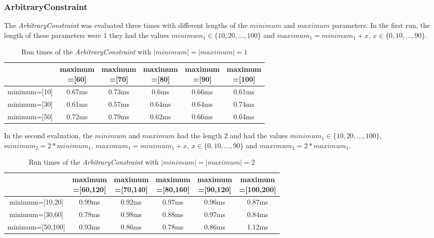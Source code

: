 \subsubsection{ArbitraryConstraint}
The \textit{ArbitraryConstraint} was evaluated three times with different lengths of the $minimum$ and $maximum$ parameters. In the first run, the length of these parameters were 1 they had the values $minimum_1\in\{10, 20, ..., 100\}$ and $maximum_1=minimum_1+x$, $x\in\{0, 10, ..., 90\}$.
\begin{table}
	\begin{tabular}{|c|c|c|c|c|c|}
		\hline
		&\makecell{maximum\\=[60]} & \makecell{maximum\\=[70]} &  \makecell{maximum\\=[80]} & \makecell{maximum\\=[90]} & \makecell{maximum\\=[100]}\\
		\hline
		minimum=[10] & 0.67ms & 0.73ms & 0.6ms & 0.66ms & 0.61ms\\
		\hline
		minimum=[30] & 0.61ms & 0.57ms & 0.64ms & 0.64ms & 0.74ms\\
		\hline
		minimum=[50] & 0.72ms & 0.79ms & 0.62ms & 0.66ms & 0.64ms\\
		\hline
	\end{tabular}
	\centering
	\caption{Run times of the \textit{ArbitraryConstraint} with $|minimum|=|maximum|=1$}
	\label{tab:runtimeArbitraryConstraint1}
\end{table}
In the second evaluation, the $minimum$ and $maximum$ had the length 2 and had the values $minimum_1\in\{10, 20, ..., 100\}$, $minimum_2=2*minimum_1$, $maximum_1=minimum_1+x$, $x\in\{0, 10, ..., 90\}$ and $maximum_2=2*maximum_1$.
\begin{table}
	\begin{tabular}{|c|c|c|c|c|c|}
		\hline
						&\makecell{maximum\\=[60,120]} & \makecell{maximum\\=[70,140]} &  \makecell{maximum\\=[80,160]} & \makecell{maximum\\=[90,120]} &  \makecell{maximum\\=[100,200]}\\
		\hline
		minimum=[10,20] & 0.99ms & 0.92ms & 0.97ms & 0.96ms & 0.87ms\\
		\hline
		minimum=[30,60] & 0.78ms & 0.98ms & 0.88ms & 0.97ms & 0.84ms\\
		\hline
		minimum=[50,100] & 0.93ms & 0.86ms & 0.78ms & 0.86ms & 1.12ms\\
		\hline
	\end{tabular}
	\centering
	\caption{Run times of the \textit{ArbitraryConstraint} with $|minimum|=|maximum|=2$}
	\label{tab:runtimeArbitraryConstraint2}
\end{table}
